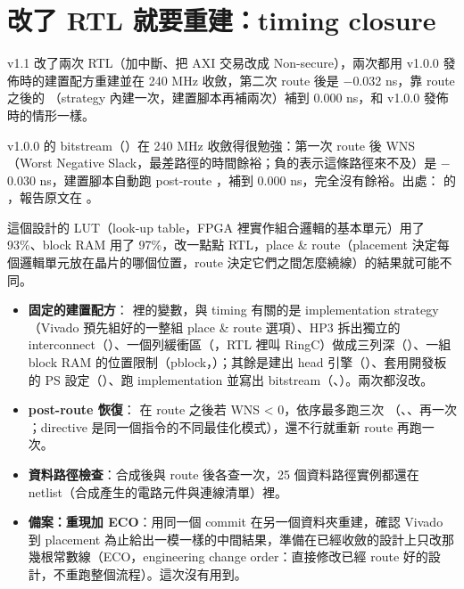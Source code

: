 \section{改了 RTL 就要重建：timing closure}
\label{sec:timing}

\begin{oneline}
v1.1 改了兩次 RTL（加中斷、把 AXI 交易改成 Non-secure），兩次都用 v1.0.0 發佈時的建置配方重建並在 240 MHz 收斂，第二次 route 後是 $-$0.032 ns，靠 route 之後的 （strategy 內建一次，建置腳本再補兩次）補到 0.000 ns，和 v1.0.0 發佈時的情形一樣。
\end{oneline}

\begin{before}
v1.0.0 的 bitstream（）在 240 MHz 收斂得很勉強：第一次 route 後 WNS（Worst Negative Slack，最差路徑的時間餘裕；負的表示這條路徑來不及）是 $-$0.030 ns，建置腳本自動跑 post-route ，補到 0.000 ns，完全沒有餘裕。出處： 的 ，報告原文在 。

這個設計的 LUT（look-up table，FPGA 裡實作組合邏輯的基本單元）用了 93\%、block RAM 用了 97\%，改一點點 RTL，place \& route（placement 決定每個邏輯單元放在晶片的哪個位置，route 決定它們之間怎麼繞線）的結果就可能不同。
\end{before}

\begin{tech}
\begin{itemize}
\item \textbf{固定的建置配方}： 裡的變數，與 timing 有關的是 implementation strategy（Vivado 預先組好的一整組 place \& route 選項）、HP3 拆出獨立的 interconnect（）、一個列緩衝區（，RTL 裡叫 RingC）做成三列深（）、一組 block RAM 的位置限制（pblock，）；其餘是建出 head 引擎（）、套用開發板的 PS 設定（）、跑 implementation 並寫出 bitstream（、）。兩次都沒改。
\item \textbf{post-route 恢復}： 在 route 之後若 WNS < 0，依序最多跑三次 （、、再一次 ；directive 是同一個指令的不同最佳化模式），還不行就重新 route 再跑一次。
\item \textbf{資料路徑檢查}：合成後與 route 後各查一次，25 個資料路徑實例都還在 netlist（合成產生的電路元件與連線清單）裡。
\item \textbf{備案：重現加 ECO}：用同一個 commit 在另一個資料夾重建，確認 Vivado 到 placement 為止給出一模一樣的中間結果，準備在已經收斂的設計上只改那幾根常數線（ECO，engineering change order：直接修改已經 route 好的設計，不重跑整個流程）。這次沒有用到。
\end{itemize}
\end{tech}

